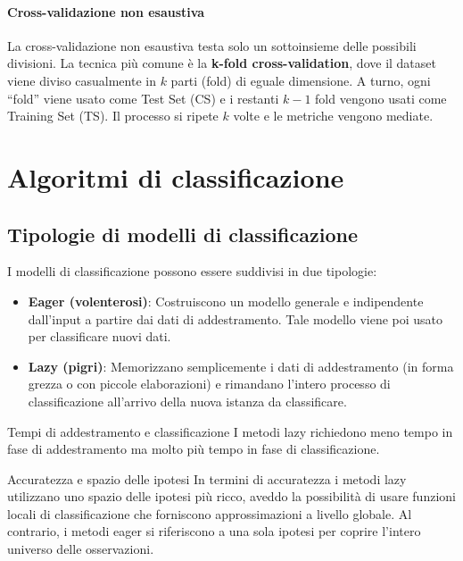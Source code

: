 \subsubsection{Cross-validazione non esaustiva}

La cross-validazione non esaustiva testa solo un sottoinsieme
delle possibili divisioni.
La tecnica più comune è la \textbf{k-fold cross-validation}, dove il dataset
viene diviso casualmente in $k$ parti (fold) di eguale dimensione.
A turno, ogni ``fold'' viene usato come Test Set (CS) e i restanti
$k-1$ fold vengono usati come Training Set (TS).
Il processo si ripete $k$ volte e le metriche vengono mediate.


\chapter{Algoritmi di classificazione}

\section{Tipologie di modelli di classificazione}

I modelli di classificazione possono essere suddivisi in due tipologie:
\begin{itemize}
    \item \textbf{Eager (volenterosi)}: Costruiscono un modello generale e
    indipendente dall'input a partire dai dati di addestramento.
    Tale modello viene poi usato per classificare nuovi dati.
    \item \textbf{Lazy (pigri)}: Memorizzano semplicemente i dati di
    addestramento (in forma grezza o con piccole elaborazioni) e rimandano
    l'intero processo di classificazione all'arrivo della nuova
    istanza da classificare.
\end{itemize}

\begin{nota}{Tempi di addestramento e classificazione}{}
I metodi lazy richiedono meno tempo in fase di addestramento ma
molto più tempo in fase di classificazione.
\end{nota}

\begin{nota}{Accuratezza e spazio delle ipotesi}{}
In termini di accuratezza i metodi lazy utilizzano uno spazio delle
ipotesi più ricco, aveddo la possibilità di usare funzioni locali
di classificazione che forniscono approssimazioni a livello globale.
Al contrario, i metodi eager si riferiscono a una sola ipotesi per coprire
l'intero universo delle osservazioni.
\end{nota}

